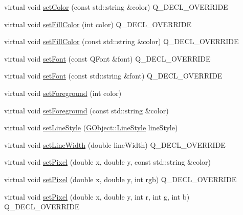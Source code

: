 \begin{DoxyCompactItemize}
\item 
virtual void \mbox{\hyperlink{classGForwardDrawingSurface_ad148324da1b0340e84e24dffa577ffca}{set\+Color}} (const std\+::string \&color) Q\+\_\+\+D\+E\+C\+L\+\_\+\+O\+V\+E\+R\+R\+I\+DE
\item 
virtual void \mbox{\hyperlink{classGForwardDrawingSurface_aba081111958a52993a29024a728435df}{set\+Fill\+Color}} (int color) Q\+\_\+\+D\+E\+C\+L\+\_\+\+O\+V\+E\+R\+R\+I\+DE
\item 
virtual void \mbox{\hyperlink{classGForwardDrawingSurface_a6fbfb241490096e9f24525a4fc5e933e}{set\+Fill\+Color}} (const std\+::string \&color) Q\+\_\+\+D\+E\+C\+L\+\_\+\+O\+V\+E\+R\+R\+I\+DE
\item 
virtual void \mbox{\hyperlink{classGForwardDrawingSurface_a2d22014c7fa3bccfd58c982aea1b55fa}{set\+Font}} (const Q\+Font \&font) Q\+\_\+\+D\+E\+C\+L\+\_\+\+O\+V\+E\+R\+R\+I\+DE
\item 
virtual void \mbox{\hyperlink{classGForwardDrawingSurface_ab39ef411fb13a52852ddd138c5932e2e}{set\+Font}} (const std\+::string \&font) Q\+\_\+\+D\+E\+C\+L\+\_\+\+O\+V\+E\+R\+R\+I\+DE
\item 
virtual void \mbox{\hyperlink{classGDrawingSurface_a7daa57084b5811b598fce8726660b328}{set\+Foreground}} (int color)
\item 
virtual void \mbox{\hyperlink{classGDrawingSurface_af59209aeadea6dfc6d97a2d8531f50e1}{set\+Foreground}} (const std\+::string \&color)
\item 
virtual void \mbox{\hyperlink{classGDrawingSurface_a6bfe14a77101db0fb97b5a7e07a5526b}{set\+Line\+Style}} (\mbox{\hyperlink{classGObject_a86e0f5648542856159bb40775c854aa7}{G\+Object\+::\+Line\+Style}} line\+Style)
\item 
virtual void \mbox{\hyperlink{classGForwardDrawingSurface_a22b7be843264ca79a9bb3851ce3368b9}{set\+Line\+Width}} (double line\+Width) Q\+\_\+\+D\+E\+C\+L\+\_\+\+O\+V\+E\+R\+R\+I\+DE
\item 
virtual void \mbox{\hyperlink{classGDrawingSurface_a09f9640e4ff7388dcfc391efd88d2415}{set\+Pixel}} (double x, double y, const std\+::string \&color)
\item 
virtual void \mbox{\hyperlink{classGForwardDrawingSurface_a1fd61df1d79ebf3db7935d5c38c222e5}{set\+Pixel}} (double x, double y, int rgb) Q\+\_\+\+D\+E\+C\+L\+\_\+\+O\+V\+E\+R\+R\+I\+DE
\item 
virtual void \mbox{\hyperlink{classGForwardDrawingSurface_af9aca140f86a6de6a4368d41349dd57c}{set\+Pixel}} (double x, double y, int r, int g, int b) Q\+\_\+\+D\+E\+C\+L\+\_\+\+O\+V\+E\+R\+R\+I\+DE

\end{DoxyCompactItemize}
